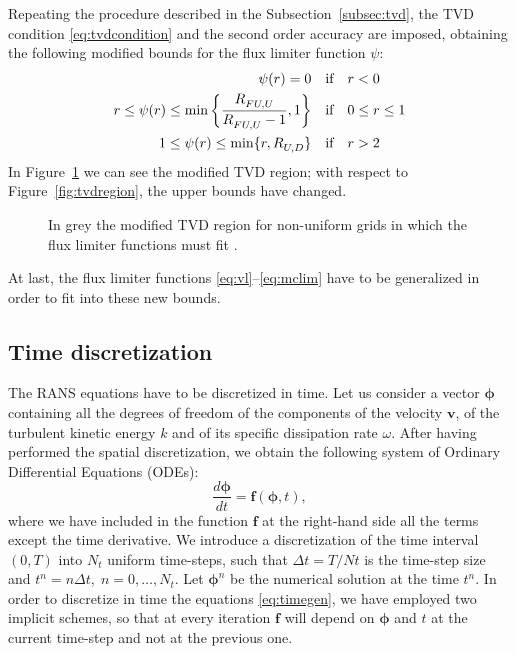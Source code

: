 Repeating the procedure described in the Subsection~\ref{subsec:tvd}, the TVD 
condition \eqref{eq:tvdcondition} and the second order accuracy are imposed, 
obtaining the following modified bounds for the flux limiter function $\psi$:
\begin{align}
\notag \psi(r) = 0 \quad &\text{if} \quad r < 0\\
r \leq \psi(r) \leq \min \bigg \{\frac{\RFUU}{\RFUU - 1}, 1 \bigg \} \quad 
&\text{if} \quad 0 \leq r \leq 1\\
\notag 1 \leq \psi(r) \leq \min \{r,\RUD \} \quad &\text{if} \quad r > 2
\end{align}
In Figure~\ref{fig:tvdregionhou} we can see the modified TVD region; with 
respect to Figure~\ref{fig:tvdregion}, the upper bounds have changed.
\begin{figure}[t]
	\centering
	
	\caption[Modified TVD region]{In grey the modified TVD region for 
	non-uniform grids in which the flux limiter functions must fit 
	\cite{nonunif:hou}.}
	\label{fig:tvdregionhou}
\end{figure} 
At last, the flux limiter functions \eqref{eq:vl}--\eqref{eq:mclim} have to be 
generalized in order to fit into these new bounds.
%
\subsection{Time discretization} \label{subsec:time}
The RANS equations have to be discretized in time.
Let us consider a vector $\boldsymbol{\phi}$ containing all the degrees of freedom of the components of the velocity $\mathbf{v}$, of the turbulent kinetic energy $k$ and of its specific dissipation rate $\omega$.
After having performed the spatial discretization, we obtain the following system of Ordinary Differential Equations (ODEs):
\begin{equation} \label{eq:timegen}
\frac{d \boldsymbol{\phi}}{dt} = \mathbf{f}(\boldsymbol{\phi}, t),
\end{equation}
where we have included in the function $\mathbf{f}$ at the right-hand side all the terms 
except the time derivative. We introduce a discretization of the time 
interval $(0, T)$ into $N_t$ uniform time-steps, such that $\Delta t = T/Nt$ is 
the time-step size and $t^n=n\Delta t, \; n=0,\dots,N_t$. Let $\boldsymbol{\phi}^n$ be the 
numerical solution at the time $t^n$. In order to 
discretize in time the equations \eqref{eq:timegen}, we have employed two 
implicit schemes, so that at every iteration $\mathbf{f}$ will depend on $\boldsymbol{\phi}$ and $t$ 
at the current time-step and not at the previous one.
%
